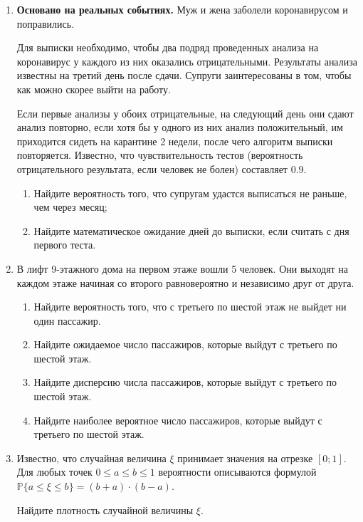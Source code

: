\begin{enumerate}
\item \textbf{Основано на реальных событиях.} Муж и жена заболели коронавирусом и поправились. 

Для выписки необходимо, чтобы два подряд проведенных анализа на коронавирус у каждого из них оказались отрицательными. 
Результаты анализа известны на третий день после сдачи. 
Супруги заинтересованы в том, чтобы как можно скорее выйти на работу. 

Если первые анализы у обоих отрицательные, на следующий день они сдают анализ повторно, 
если хотя бы у одного из них анализ положительный, им приходится сидеть на карантине 2 недели, 
после чего алгоритм выписки повторяется. 
Известно, что чувствительность тестов (вероятность отрицательного результата, если человек не болен) 
составляет 0.9. 
	
\begin{enumerate}
    
    \item Найдите вероятность того, что супругам удастся выписаться не раньше, чем через месяц;
    
    \item Найдите математическое ожидание дней до выписки, если считать с дня первого теста.
    
\end{enumerate}

\item  В лифт 9-этажного дома на первом этаже вошли 5 человек. 
Они выходят на каждом этаже начиная со второго равновероятно и независимо друг от друга.

\begin{enumerate}
    
    \item Найдите вероятность того, что с третьего по шестой этаж не выйдет ни один пассажир.
    
    \item Найдите ожидаемое число пассажиров, которые выйдут с третьего по шестой этаж.
    
    \item Найдите дисперсию числа пассажиров, которые выйдут с третьего по шестой этаж.
    
    \item Найдите наиболее вероятное число пассажиров, которые выйдут с третьего по шестой этаж.
    
\end{enumerate}

\item Известно, что случайная величина $\xi$ принимает значения на отрезке $[0; 1]$. 
Для любых точек $0 \leq a \leq b \leq 1$ 
вероятности описываются формулой $\mathbb{P}{\{a \leq \xi \leq b\}} = (b+a) \cdot (b - a)$. 

Найдите плотность случайной величины $\xi$.
\end{enumerate}






